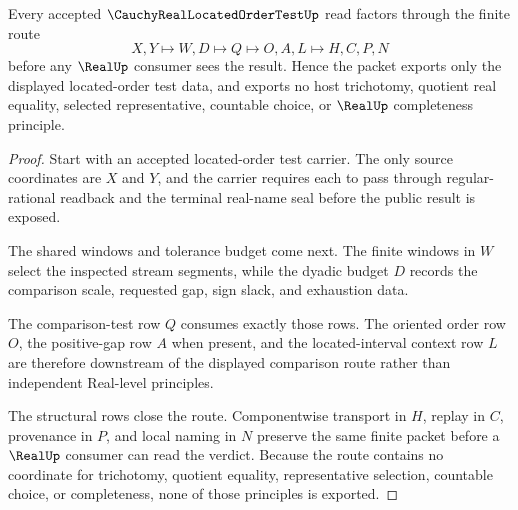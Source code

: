 \begin{theorem}
\label{thm:cauchy-real-located-order-test-finite-decision-route}
Every accepted $\CauchyRealLocatedOrderTestUp$ read factors through the finite route
$$
X,Y \longmapsto W,D \longmapsto Q \longmapsto O,A,L \longmapsto H,C,P,N
$$
before any $\RealUp$ consumer sees the result. Hence the packet exports only the displayed located-order test data, and exports no host trichotomy, quotient real equality, selected representative, countable choice, or $\RealUp$ completeness principle.
\end{theorem}
\begin{proof}
Start with an accepted located-order test carrier. The only source coordinates are $X$ and $Y$, and the carrier requires each to pass through regular-rational readback and the terminal real-name seal before the public result is exposed.

The shared windows and tolerance budget come next. The finite windows in $W$ select the inspected stream segments, while the dyadic budget $D$ records the comparison scale, requested gap, sign slack, and exhaustion data.

The comparison-test row $Q$ consumes exactly those rows. The oriented order row $O$, the positive-gap row $A$ when present, and the located-interval context row $L$ are therefore downstream of the displayed comparison route rather than independent Real-level principles.

The structural rows close the route. Componentwise transport in $H$, replay in $C$, provenance in $P$, and local naming in $N$ preserve the same finite packet before a $\RealUp$ consumer can read the verdict. Because the route contains no coordinate for trichotomy, quotient equality, representative selection, countable choice, or completeness, none of those principles is exported.
\end{proof}

